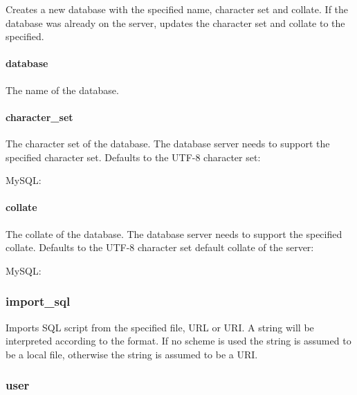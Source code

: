 Creates a new database with the specified name, character set and collate.
If the database was already on the server, updates the character set and collate
to the specified.

\paragraph{database}

The name of the database.

\paragraph{character\_set}

The character set of the database. The database server needs to support the
specified character set.
Defaults to the UTF-8 character set:

\begin{compactitem}
\item MySQL: 
\end{compactitem}

\paragraph{collate}

The collate of the database. The database server needs to support the
specified collate. Defaults to the UTF-8 character set default collate of
the server:

\begin{compactitem}
\item MySQL: 
\end{compactitem}

\subsubsection{import\_sql}


Imports SQL script from the specified file, URL or URI. A string will be
interpreted according to the format. If no scheme is used the string
is assumed to be a local file, otherwise the string is assumed to be a URI.

\subsubsection{user}

